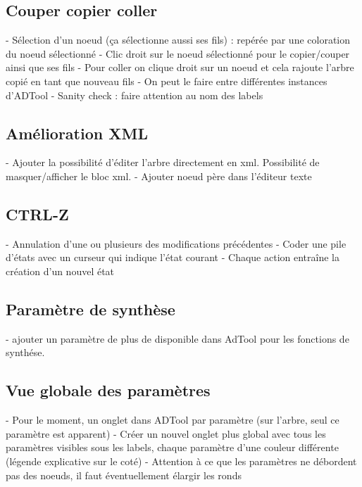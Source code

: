 	\subsection{Couper copier coller}
	
	- Sélection d'un noeud (ça sélectionne aussi ses fils) : repérée par une coloration du noeud sélectionné
	- Clic droit sur le noeud sélectionné pour le copier/couper ainsi que ses fils
	- Pour coller on clique droit sur un noeud et cela rajoute l'arbre copié en tant que nouveau fils
	- On peut le faire entre différentes instances d'ADTool
	- Sanity check : faire attention au nom des labels

	\subsection{Amélioration XML}

	- Ajouter la possibilité d'éditer l'arbre directement en xml. Possibilité de masquer/afficher le bloc xml.
	- Ajouter noeud père dans l'éditeur texte 
	
	\subsection{CTRL-Z}

	- Annulation d'une ou plusieurs des modifications précédentes
	- Coder une pile d'états avec un curseur qui indique l'état courant
	- Chaque action entraîne la création d'un nouvel état
	
	\subsection{Paramètre de synthèse}
	- ajouter un paramètre de plus de disponible dans AdTool pour les fonctions de synthése.
		
	\subsection{Vue globale des paramètres}

	- Pour le moment, un onglet dans ADTool par paramètre (sur l'arbre, seul ce paramètre est apparent)	
	- Créer un nouvel onglet plus global avec tous les paramètres visibles sous les labels, chaque paramètre d'une couleur différente (légende explicative sur le coté)
	- Attention à ce que les paramètres ne débordent pas des noeuds, il faut éventuellement élargir les ronds